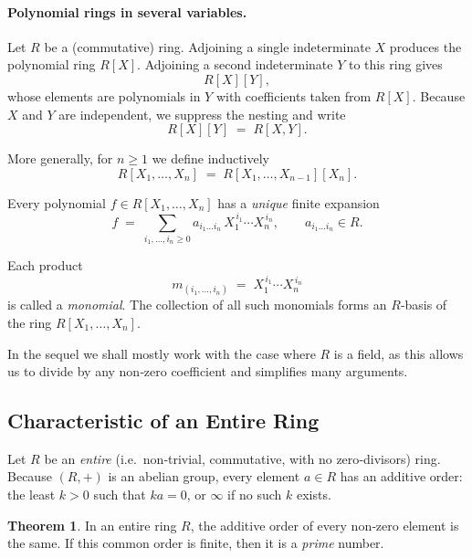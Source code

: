 \documentclass[12pt]{article}
\title{}
\author{Jerich Lee}
\date{\today}
\theoremstyle{definition} %
\newtheorem{theorem}{Theorem}
\theoremstyle{plain} %
\begin{document}
\maketitle
\paragraph{Polynomial rings in several variables.}
Let $R$ be a (commutative) ring.  
Adjoining a single indeterminate $X$ produces the polynomial ring $R[X]$.  
Adjoining a second indeterminate $Y$ to this ring gives
\[
  R[X][Y],
\]
whose elements are polynomials in $Y$ with coefficients taken from $R[X]$.
Because $X$ and $Y$ are independent, we suppress the nesting and write
\[
  R[X][Y] \;=\; R[X,Y].
\]

More generally, for $n\ge 1$ we define inductively
\[
  R[X_1,\dots,X_n]
  \;=\;
  R[X_1,\dots,X_{n-1}][X_n].
\]

Every polynomial $f\in R[X_1,\dots,X_n]$ has a \emph{unique} finite expansion
\[
  f
  \;=\;
  \sum_{i_1,\dots,i_n\ge 0}
    a_{i_1\dots i_n}\,X_1^{\,i_1}\cdots X_n^{\,i_n},
  \qquad
  a_{i_1\dots i_n}\in R.
\]

Each product
\[
  m_{(i_1,\dots,i_n)}
  \;=\;
  X_1^{\,i_1}\cdots X_n^{\,i_n}
\]
is called a \emph{monomial}.  The collection of all such monomials forms an $R$‑basis of the ring $R[X_1,\dots,X_n]$.

In the sequel we shall mostly work with the case where $R$ is a field, as this allows us to divide by any non‑zero coefficient and simplifies many arguments.
\subsection{Characteristic of an Entire Ring}

Let \(R\) be an \emph{entire} (i.e.\ non‑trivial, commutative, with no zero‑divisors) ring.
Because \((R,+)\) is an abelian group, every element \(a\in R\) has an additive order:
the least \(k>0\) such that \(ka=0\), or \(\infty\) if no such \(k\) exists.

\begin{theorem}
In an entire ring \(R\), the additive order of every non‑zero element is the same.
If this common order is finite, then it is a \emph{prime} number.
\end{theorem}
\end{document}
